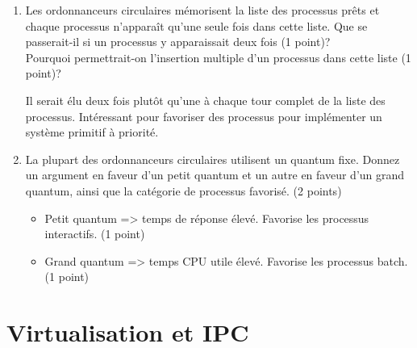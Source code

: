 \begin{enumerate}
\item Les ordonnanceurs circulaires mémorisent la liste des processus prêts et chaque processus n'apparaît qu'une seule fois dans cette liste. Que se passerait-il si un processus y apparaissait deux fois (1 point)? \\
      Pourquoi permettrait-on l'insertion multiple d'un processus dans cette liste (1 point)?

\begin{correction}
Il serait élu deux fois plutôt qu'une à chaque tour complet de la liste des processus. Intéressant pour favoriser des processus pour implémenter un système primitif à priorité.
\end{correction}


\item La plupart des ordonnanceurs circulaires utilisent un quantum fixe. Donnez un argument en faveur d'un petit quantum et un autre en faveur d'un grand quantum, ainsi que la catégorie de processus favorisé. (2 points)

\begin{correction}
\begin{itemize}
  \item Petit quantum => temps de réponse élevé. Favorise les processus interactifs.  (1 point)
  \item Grand quantum => temps CPU utile élevé. Favorise les processus batch. (1 point)
\end{itemize}
\end{correction}

\end{enumerate}





\section{{Virtualisation et IPC}
         {\hfill{} }}

